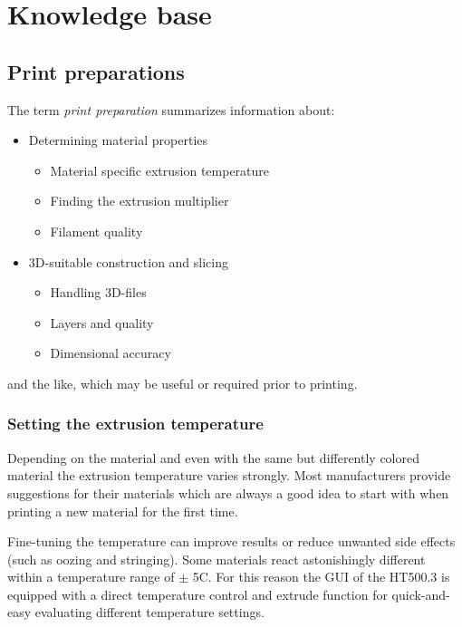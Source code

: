 \section{Knowledge base}

\subsection{Print preparations}

The term \emph{print preparation} summarizes information about:

\begin{itemize}
  \item Determining material properties

    \begin{itemize}
      \item Material specific extrusion temperature
      \item Finding the extrusion multiplier
      \item Filament quality
    \end{itemize}

  \item 3D-suitable construction and slicing
    \begin{itemize}
      \item Handling 3D-files
      \item Layers and quality
      \item Dimensional accuracy
    \end{itemize}

\end{itemize}

and the like, which may be useful or required prior to printing. 

\subsubsection{Setting the extrusion temperature}

Depending on the material and even with the same but differently colored material the extrusion temperature varies strongly. Most manufacturers provide suggestions for their materials which are always a good idea to start with when printing a new material for the first time.

Fine-tuning the temperature can improve results or reduce unwanted side effects (such as oozing and stringing). Some materials react astonishingly different within a temperature range of $\pm$ 5\degree C. For this reason the GUI of the HT500.3 is equipped with a direct temperature control and extrude function for quick-and-easy evaluating different temperature settings.

